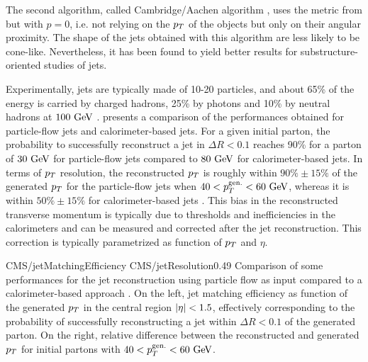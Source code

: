     The second algorithm, called Cambridge/Aachen algorithm \cite{CA}, uses the metric from
     but with $p = 0$, i.e. not relying on the $p_T$ of
    the objects but only on their angular proximity. The shape of the jets obtained with
    this algorithm are less likely to be cone-like. Nevertheless, it has been found to
    yield better results for substructure-oriented studies of jets.


    Experimentally, jets are typically made of 10-20 particles, and about 65\% of the
    energy is carried by charged hadrons, 25\% by photons and 10\% by neutral hadrons
    at $100~\text{GeV}$ \cite{JetPerf}.
     presents a comparison of the performances obtained
    for particle-flow jets and calorimeter-based jets. For a given initial parton, the
    probability to successfully reconstruct a jet in $\Delta R < 0.1$ reaches 90\% for
    a parton of $30~\text{GeV}$ for particle-flow jets compared to $80~\text{GeV}$ for
    calorimeter-based jets. In terms of $p_T$ resolution, the reconstructed $p_T$ is
    roughly within $90\% \pm 15\%$ of the generated $p_T$ for the particle-flow jets
    when $40 < p_T^\text{gen.} < 60~\text{GeV}$, whereas it is within $50\% \pm 15\%$ for
    calorimeter-based jets \cite{particleFlow}. This bias in the reconstructed transverse momentum
    is typically due to thresholds and inefficiencies in the calorimeters
    and can be measured and corrected after the jet reconstruction. This correction is
    typically parametrized as function of $p_T$ and $\eta$.

    {CMS/jetMatchingEfficiency}
    {CMS/jetResolution}{0.49}
    {Comparison of some performances for the jet reconstruction using particle flow as
    input compared to a calorimeter-based approach \cite{particleFlow}. On the left, jet matching efficiency
    as function of the generated $p_T$ in the central region $\left| \eta \right| < 1.5$, effectively
    corresponding to the probability of successfully reconstructing a jet within
    $\Delta R < 0.1$ of the generated parton. On the right, relative difference between
    the reconstructed and generated $p_T$ for initial partons with $40 < p_T^\text{gen.} < 60~\text{GeV}$.
    }

